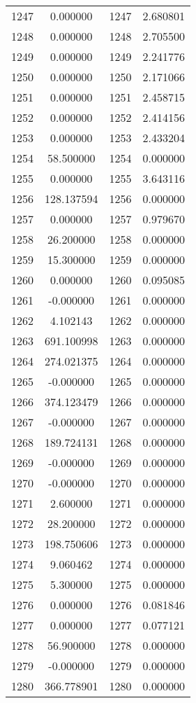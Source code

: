 \documentclass[12pt]{article}
\begin{document}
\begin{longtable}{@{}cccc@{}}
1247 & 0.000000 & 1247 & 2.680801 \\
1248 & 0.000000 & 1248 & 2.705500 \\
1249 & 0.000000 & 1249 & 2.241776 \\
1250 & 0.000000 & 1250 & 2.171066 \\
1251 & 0.000000 & 1251 & 2.458715 \\
1252 & 0.000000 & 1252 & 2.414156 \\
1253 & 0.000000 & 1253 & 2.433204 \\
1254 & 58.500000 & 1254 & 0.000000 \\
1255 & 0.000000 & 1255 & 3.643116 \\
1256 & 128.137594 & 1256 & 0.000000 \\
1257 & 0.000000 & 1257 & 0.979670 \\
1258 & 26.200000 & 1258 & 0.000000 \\
1259 & 15.300000 & 1259 & 0.000000 \\
1260 & 0.000000 & 1260 & 0.095085 \\
1261 & -0.000000 & 1261 & 0.000000 \\
1262 & 4.102143 & 1262 & 0.000000 \\
1263 & 691.100998 & 1263 & 0.000000 \\
1264 & 274.021375 & 1264 & 0.000000 \\
1265 & -0.000000 & 1265 & 0.000000 \\
1266 & 374.123479 & 1266 & 0.000000 \\
1267 & -0.000000 & 1267 & 0.000000 \\
1268 & 189.724131 & 1268 & 0.000000 \\
1269 & -0.000000 & 1269 & 0.000000 \\
1270 & -0.000000 & 1270 & 0.000000 \\
1271 & 2.600000 & 1271 & 0.000000 \\
1272 & 28.200000 & 1272 & 0.000000 \\
1273 & 198.750606 & 1273 & 0.000000 \\
1274 & 9.060462 & 1274 & 0.000000 \\
1275 & 5.300000 & 1275 & 0.000000 \\
1276 & 0.000000 & 1276 & 0.081846 \\
1277 & 0.000000 & 1277 & 0.077121 \\
1278 & 56.900000 & 1278 & 0.000000 \\
1279 & -0.000000 & 1279 & 0.000000 \\
1280 & 366.778901 & 1280 & 0.000000 \\

\end{longtable}
\end{document}
